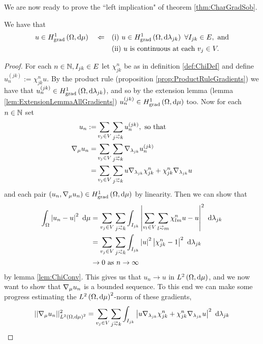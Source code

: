 We are now ready to prove the ``left implication" of theorem \ref{thm:CharGradSob}.
\begin{prop} \label{prop:CharGradSobLeftImplies}
	We have that
	\begin{align*}
		u\in\gradSob{\ddom}{\ddmes} \quad \Leftarrow 
		&\quad\text{(i)} \ u\in\gradSob{\ddom}{\lambda_{jk}} \ \forall I_{jk}\in E, \text{ and}\\
		&\quad\text{(ii)} \ u \text{ is continuous at each } v_j\in V.
	\end{align*}
\end{prop}
\begin{proof}
	For each $n\in\mathbb{N}, I_{jk}\in E$ let $\chi_{jk}^n$ be as in definition \ref{def:ChiDef} and define $u_n^{(jk)} := \chi_{jk}^n u$.
	By the product rule (proposition \ref{prop:ProductRuleGradients}) we have that $u_n^{(jk)}\in H^1_\mathrm{grad}\left( \Omega, \mathrm{d}\lambda_{jk} \right)$, and so by the extension lemma (lemma \ref{lem:ExtensionLemmaAllGradients}) $u_n^{(jk)}\in H^1_\mathrm{grad}\left( \Omega, \mathrm{d}\mu \right)$ too.
	Now for each $n\in\mathbb{N}$ set
	\begin{align*}
		u_n := &\sum_{v_j\in V}\sum_{j\conLeft k}u_n^{(jk)}, \text{ so that } \\
		\grad_\ddmes u_n = &\sum_{v_j\in V}\sum_{j\conLeft k} \grad_{\lambda_{jk}}u_n^{(jk)} \\
		= &\sum_{v_j\in V}\sum_{j\conLeft k} u\grad_{\lambda_{jk}}\chi_{jk}^n + \chi_{jk}^n\grad_{\lambda_{jk}}u
	\end{align*}
	and each pair $\left( u_n, \nabla_\mu u_n \right)\in H^1_\mathrm{grad}\left( \Omega, \mathrm{d}\mu \right)$ by linearity.
	Then we can show that
	\begin{align*}
		\integral{\ddom}{\abs{ u_n - u }^2}{\ddmes}
		&= \sum_{v_j\in V}\sum_{j\conLeft k}\integral{I_{jk}}{\abs{ \sum_{v_l\in V}\sum_{l\conLeft m}\chi_{lm}^n u - u }^2}{\lambda_{jk}} \\
		&= \sum_{v_j\in V}\sum_{j\conLeft k}\integral{I_{jk}}{\abs{u}^2\abs{ \chi_{jk}^n - 1 }^2}{\lambda_{jk}} \\
		&\rightarrow 0 \toInfty{n}
	\end{align*}
	by lemma \ref{lem:ChiConv}.
	This gives us that $u_n\rightarrow u$ in $L^{2}\left( \Omega,\mathrm{d}\mu \right)$, and we now want to show that $\nabla_{\mu}u_n$ is a bounded sequence.
	To this end we can make some progress estimating the $L^{2}\left( \Omega,\mathrm{d}\mu \right)^2$-norm of these gradients,
	\begin{align*}
		\norm{\grad_{\ddmes}u_n}_{\ltwo{\ddom}{\ddmes}^2}^2
		&= \sum_{v_j\in V}\sum_{j\conLeft k} \integral{I_{jk}}{\abs{ u\grad_{\lambda_{jk}}\chi_{jk}^n + \chi_{jk}^n\grad_{\lambda_{jk}}u }^2}{\lambda_{jk}} \\

\end{align*}
\end{proof}
